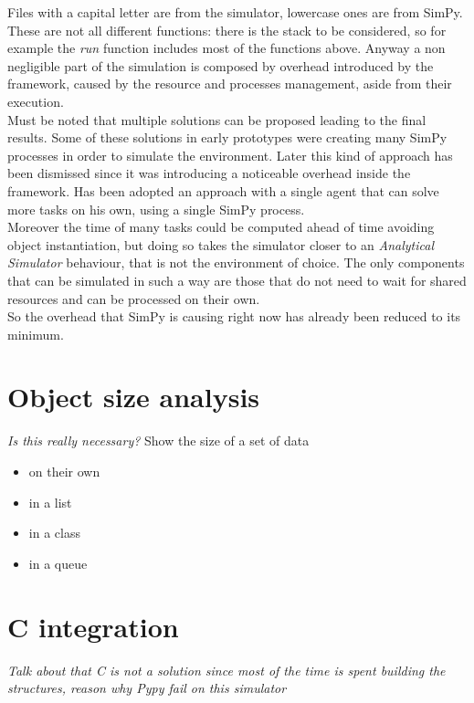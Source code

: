 Files with a capital letter are from the simulator, lowercase ones are from
SimPy. These are not all different functions: there is the stack to be
considered, so for example the \textit{run} function includes most of the functions above.
Anyway a non negligible part of the simulation is composed by overhead
introduced by the framework, caused by the resource  and processes management,
aside from their execution. \\
Must be noted that multiple solutions can be proposed leading to the final
results. Some of these solutions in early prototypes were creating many SimPy
processes in order to simulate the environment.  Later this kind of approach has
been dismissed since it was introducing a noticeable overhead inside the
framework. Has been adopted an approach with a single agent that can solve more
tasks on his own, using a single SimPy process.  \\
Moreover the time of many tasks could be computed ahead of time avoiding object
instantiation, but doing so takes the simulator closer to an \textit{Analytical
Simulator} behaviour, that is not the environment of choice. The only components
that can be simulated in such a way are those that do not need to wait for
shared resources and can be processed on their own. \\
So the overhead that SimPy is causing right now has already been reduced to its
minimum.

\section{Object size analysis}
\textit{Is this really necessary?}
Show the size of a set of data
\begin{itemize}
    \item on their own
    \item in a list
    \item in a class
    \item in a queue
\end{itemize}

\section{C integration}
\textit{Talk about that C is not a solution since most of the time is spent
building the structures, reason why Pypy fail on this simulator}
